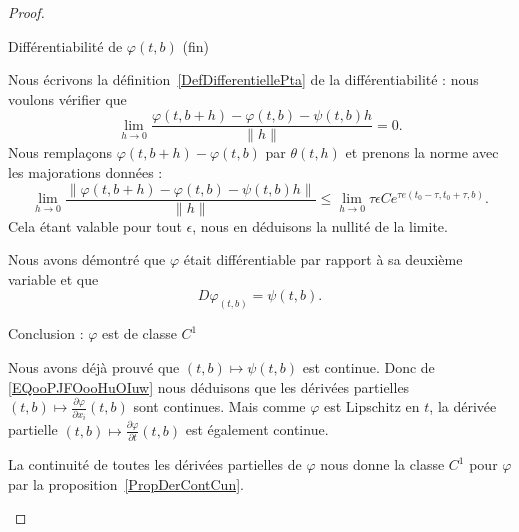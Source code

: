 \begin{proof}
\begin{subproof}
\begin{subproof}
        \item[Différentiabilité de \( \varphi(t,b)\) (fin)]

            Nous écrivons la définition~\ref{DefDifferentiellePta} de la différentiabilité : nous voulons vérifier que
            \begin{equation}
                \lim_{h\to 0} \frac{ \varphi(t,b+h)-\varphi(t,b)-\psi(t,b)h }{ \| h \| }=0.
            \end{equation}
            Nous remplaçons \( \varphi(t,b+h)-\varphi(t,b)\) par \( \theta(t,h)\) et prenons la norme avec les majorations données :
            \begin{equation}
                \lim_{h\to 0} \frac{ \|  \varphi(t,b+h)-\varphi(t,b)-\psi(t,b)h  \|   }{ \| h \| }\leq \lim_{h\to 0} \tau\epsilon C e^{\tau e(t_0-\tau,t_0+\tau,b)}.
            \end{equation}
            Cela étant valable pour tout \( \epsilon\), nous en déduisons la nullité de la limite.

            Nous avons démontré que \( \varphi\) était différentiable par rapport à sa deuxième variable et que
            \begin{equation}        \label{EQooPJFOooHuOIuw}
                D\varphi_{(t,b)}=\psi(t,b).
            \end{equation}
            \end{subproof}

        \item[Conclusion : \( \varphi\) est de classe \( C^1\)]

            Nous avons déjà prouvé que \( (t,b)\mapsto \psi(t,b)\) est continue. Donc de \eqref{EQooPJFOooHuOIuw} nous déduisons que les dérivées partielles \(  (t,b)\mapsto\frac{ \partial \varphi }{ \partial x_i } (t,b)\) sont continues. Mais comme \( \varphi\) est Lipschitz en \( t\), la dérivée partielle \( (t,b)\mapsto \frac{ \partial \varphi }{ \partial t }(t,b)\) est également continue.

            La continuité de toutes les dérivées partielles de \( \varphi\) nous donne la classe \( C^1\) pour \( \varphi\) par la proposition~\ref{PropDerContCun}.
    \end{subproof}
\end{proof}

